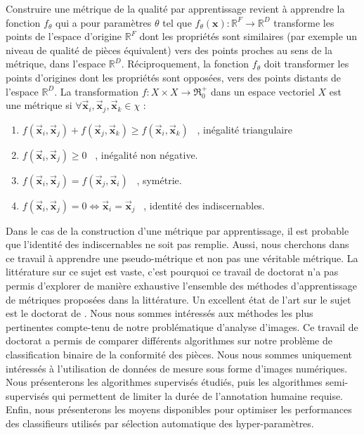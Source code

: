 Construire une métrique de la qualité par apprentissage revient à apprendre la fonction $f_{\theta}$ qui a pour paramètres $\theta$ tel que $f_{\theta}(\mathbf{x}) : \mathbb{R}^{F} \rightarrow \mathbb{R}^{D}$ transforme les points de l'espace d'origine $\mathbb{R}^{F}$ dont les propriétés sont similaires (par exemple un niveau de qualité de pièces équivalent) vers des points proches au sens de la métrique, dans l'espace $\mathbb{R}^{D}$.
Réciproquement, la fonction $f_{\theta}$ doit transformer les points d'origines dont les propriétés sont opposées, vers des points distants de l'espace $\mathbb{R}^{D}$.
La transformation $f : X \times X \rightarrow \Re_{0}^{+} $ dans un espace vectoriel $X$ est une métrique si $\forall \vec{\mathbf{x}}_{i}, \vec{\mathbf{x}}_{j}, \vec{\mathbf{x}}_{k} \in \chi$ :

\begin{enumerate}
	\item $f\left(\vec{\mathbf{x}}_{i}, \vec{\mathbf{x}}_{j}\right) + f\left(\vec{\mathbf{x}}_{j}, \vec{\mathbf{x}}_{k}\right) \geq f\left(\vec{\mathbf{x}}_{i}, \vec{\mathbf{x}}_{k}\right)$ \ , inégalité triangulaire
	\item $f\left(\vec{\mathbf{x}}_{i}, \vec{\mathbf{x}}_{j}\right) \geq 0$ \ , inégalité non négative.
	\item $f\left(\vec{\mathbf{x}}_{i}, \vec{\mathbf{x}}_{j}\right)=f\left(\vec{\mathbf{x}}_{j}, \vec{\mathbf{x}}_{i}\right)$ \ , symétrie.
	\item $f\left(\vec{\mathbf{x}}_{i}, \vec{\mathbf{x}}_{j}\right)=0 \Longleftrightarrow \vec{\mathbf{x}}_{i}=\vec{\mathbf{x}}_{j}$ \ , identité des indiscernables.
\end{enumerate}

Dans le cas de la construction d'une métrique par apprentissage, il est probable que l'identité des indiscernables ne soit pas remplie.
Aussi, nous cherchons dans ce travail à apprendre une pseudo-métrique et non pas une véritable métrique.
La littérature sur ce sujet est vaste, c'est pourquoi ce travail de doctorat n'a pas permis d'explorer de manière exhaustive l'ensemble des méthodes d'apprentissage de métriques proposées dans la littérature.
Un excellent état de l'art sur le sujet est le doctorat de \citeauthor{bellet_supervised_2012} \cite{bellet_supervised_2012}.
Nous nous sommes intéressés aux méthodes les plus pertinentes compte-tenu de notre problématique d'analyse d'images.
Ce travail de doctorat a permis de comparer différents algorithmes sur notre problème de classification binaire de la conformité des pièces.
Nous nous sommes uniquement intéressés à l'utilisation de données de mesure sous forme d'images numériques.
Nous présenterons les algorithmes supervisés étudiés, puis les algorithmes semi-supervisés qui permettent de limiter la durée de l'annotation humaine requise.
Enfin, nous présenterons les moyens disponibles pour optimiser les performances des classifieurs utilisés par sélection automatique des hyper-paramètres.

